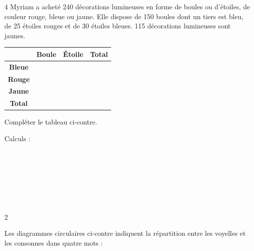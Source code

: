 \documentclass[a4paper]{book}
\begin{document}
{    \begin{exerciceNote}{4}
        Myriam a acheté 240 décorations lumineuses en forme de boules ou d'étoiles, de couleur rouge, bleue ou jaune. Elle dispose de 150 boules dont un tiers est bleu, de 25 étoiles rouges et de 30 étoiles bleues. 115 décorations lumineuses sont jaunes. 

        \medskip

        \begin{minipage}{0.5\linewidth}
            \begin{center}
                \begin{tabular}{|c|c|c|c|}
                    \hline
                     & \textbf{Boule} & \textbf{Étoile} & \textbf{Total} \\
                    \hline
                    \textbf{Bleue} & & & \\
                    \hline
                    \textbf{Rouge} & &  & \\
                    \hline
                    \textbf{Jaune} & & & \\
                    \hline
                    \textbf{Total} & & & \\
                    \hline
                \end{tabular}
            \end{center}
        \end{minipage}
        \hfill
        \begin{minipage}{0.49\linewidth}
            Compléter le tableau ci-contre. 
            
            Calculs : 

            \points[17] \\ \points[17] \\ \points[17] \\ \points[17]     
        \end{minipage}     

        \bigskip

         \points[38] \\ \points[38] \\
    \end{exerciceNote}


    \begin{exerciceNote}{2}
        \begin{minipage}{0.3\linewidth}
            \begin{center}
            \end{center}
        \end{minipage}
        \hfill
        \begin{minipage}{0.49\linewidth}
            Les diagrammes circulaires ci-contre indiquent la répartition entre les voyelles et les consonnes dans quatre mots : 
            

\end{minipage}
\end{exerciceNote}}
\end{document}
